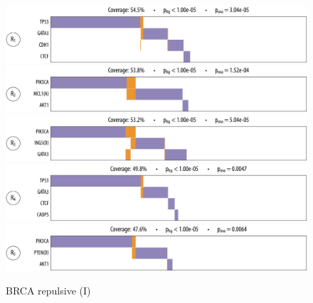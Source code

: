 \begin{figure}[htbp]
\centering
\includegraphics[width=\textwidth]{figures/genes/brca_1.pdf}\\[2em]
\includegraphics[width=\textwidth]{figures/genes/brca_6.pdf}\\[2em]
\includegraphics[width=\textwidth]{figures/genes/brca_8.pdf}\\[2em]
\includegraphics[width=\textwidth]{figures/genes/brca_2.pdf}\\[2em]
\includegraphics[width=\textwidth]{figures/genes/brca_5.pdf}\\[2em]
\caption{BRCA repulsive (I)}
\end{figure}

